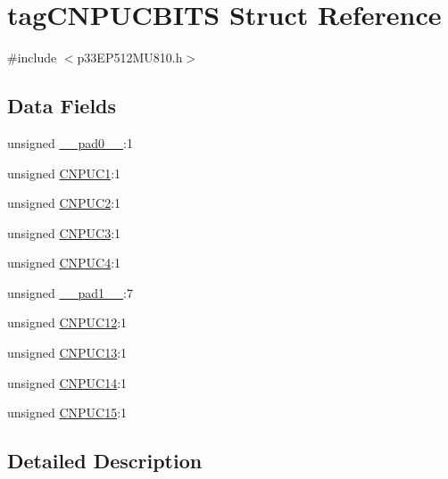 \hypertarget{structtag_c_n_p_u_c_b_i_t_s}{}\section{tag\+C\+N\+P\+U\+C\+B\+I\+TS Struct Reference}
\label{structtag_c_n_p_u_c_b_i_t_s}


{\ttfamily \#include $<$p33\+E\+P512\+M\+U810.\+h$>$}

\subsection*{Data Fields}
\begin{DoxyCompactItemize}
\item 
unsigned \hyperlink{structtag_c_n_p_u_c_b_i_t_s_adf71f3d8410c1f1dbbc96680a92c49af}{\+\_\+\+\_\+pad0\+\_\+\+\_\+}\+:1
\item 
unsigned \hyperlink{structtag_c_n_p_u_c_b_i_t_s_acc570b19c2be2b2d1a5576e857c6da6b}{C\+N\+P\+U\+C1}\+:1
\item 
unsigned \hyperlink{structtag_c_n_p_u_c_b_i_t_s_aafc6cbc6a910bda89cb2063ebe6e0d98}{C\+N\+P\+U\+C2}\+:1
\item 
unsigned \hyperlink{structtag_c_n_p_u_c_b_i_t_s_a40d2730a2421aa29415ea389bedea982}{C\+N\+P\+U\+C3}\+:1
\item 
unsigned \hyperlink{structtag_c_n_p_u_c_b_i_t_s_afd09b4aeed903dabb139d5bb30b80b6c}{C\+N\+P\+U\+C4}\+:1
\item 
unsigned \hyperlink{structtag_c_n_p_u_c_b_i_t_s_acaf2d0924a107ec6e8d2e31febaf66f9}{\+\_\+\+\_\+pad1\+\_\+\+\_\+}\+:7
\item 
unsigned \hyperlink{structtag_c_n_p_u_c_b_i_t_s_a47a68db9174f3e93a5a4fde51fec9856}{C\+N\+P\+U\+C12}\+:1
\item 
unsigned \hyperlink{structtag_c_n_p_u_c_b_i_t_s_a68d6117e3ed3bad5abc6a29d24d74572}{C\+N\+P\+U\+C13}\+:1
\item 
unsigned \hyperlink{structtag_c_n_p_u_c_b_i_t_s_aeadfd6aaf42d3487299ab049a7bd59f9}{C\+N\+P\+U\+C14}\+:1
\item 
unsigned \hyperlink{structtag_c_n_p_u_c_b_i_t_s_a3ce978fc07abc8d80049313e019a29f9}{C\+N\+P\+U\+C15}\+:1
\end{DoxyCompactItemize}


\subsection{Detailed Description}


